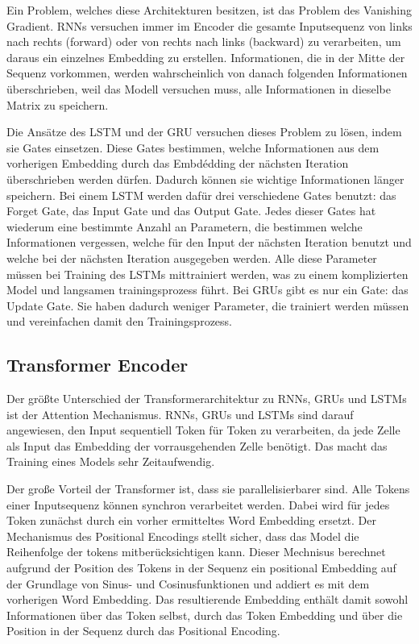 Ein Problem, welches diese Architekturen besitzen, ist das Problem des Vanishing Gradient.
RNNs versuchen immer im Encoder die gesamte Inputsequenz von links nach rechts (forward) oder von rechts nach links (backward) zu verarbeiten, um daraus ein einzelnes Embedding zu erstellen.
Informationen, die in der Mitte der Sequenz vorkommen, werden wahrscheinlich von danach folgenden Informationen überschrieben, weil das Modell versuchen muss, alle Informationen in dieselbe Matrix zu speichern. 

Die Ansätze des LSTM und der GRU versuchen dieses Problem zu lösen, indem sie Gates einsetzen.
Diese Gates bestimmen, welche Informationen aus dem vorherigen Embedding durch das Embdédding der nächsten Iteration überschrieben werden dürfen.
Dadurch können sie wichtige Informationen länger speichern.
Bei einem LSTM werden dafür drei verschiedene Gates benutzt: das Forget Gate, das Input Gate und das Output Gate.
Jedes dieser Gates hat wiederum eine bestimmte Anzahl an Parametern, die bestimmen welche Informationen vergessen, welche für den Input der nächsten Iteration benutzt und welche bei der nächsten Iteration ausgegeben werden.
Alle diese Parameter müssen bei Training des LSTMs mittrainiert werden, was zu einem komplizierten Model und langsamen trainingsprozess führt.
Bei GRUs gibt es nur ein Gate: das Update Gate.
Sie haben dadurch weniger Parameter, die trainiert werden müssen und vereinfachen damit den Trainingsprozess.
\cite{pirani2022}

\subsection{Transformer Encoder}

Der größte Unterschied der Transformerarchitektur zu RNNs, GRUs und LSTMs ist der Attention Mechanismus.
RNNs, GRUs und LSTMs sind darauf angewiesen, den Input sequentiell Token für Token zu verarbeiten, da jede Zelle als Input das Embedding der vorrausgehenden Zelle benötigt.
Das macht das Training eines Models sehr Zeitaufwendig.

Der große Vorteil der Transformer ist, dass sie parallelisierbarer sind.
Alle Tokens einer Inputsequenz können synchron verarbeitet werden. 
Dabei wird für jedes Token zunächst durch ein vorher ermitteltes Word Embedding ersetzt.
Der Mechanismus des Positional Encodings stellt sicher, dass das Model die Reihenfolge der tokens mitberücksichtigen kann.
Dieser Mechnisus berechnet aufgrund der Position des Tokens in der Sequenz ein positional Embedding auf der Grundlage von Sinus- und Cosinusfunktionen und addiert es mit dem vorherigen Word Embedding.
Das resultierende Embedding enthält damit sowohl Informationen über das Token selbst, durch das Token Embedding und über die Position in der Sequenz durch das Positional Encoding.


